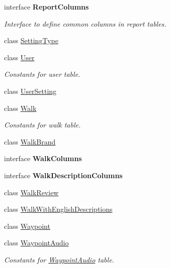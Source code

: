 \begin{DoxyCompactItemize}
interface {\bfseries Report\+Columns}
\begin{DoxyCompactList}\small\item\em Interface to define common columns in report tables. \end{DoxyCompactList}\item 
class \hyperlink{classuk_1_1ac_1_1swan_1_1digitaltrails_1_1database_1_1_white_rock_contract_1_1_setting_type}{Setting\+Type}
\item 
class \hyperlink{classuk_1_1ac_1_1swan_1_1digitaltrails_1_1database_1_1_white_rock_contract_1_1_user}{User}
\begin{DoxyCompactList}\small\item\em Constants for user table. \end{DoxyCompactList}\item 
class \hyperlink{classuk_1_1ac_1_1swan_1_1digitaltrails_1_1database_1_1_white_rock_contract_1_1_user_setting}{User\+Setting}
\item 
class \hyperlink{classuk_1_1ac_1_1swan_1_1digitaltrails_1_1database_1_1_white_rock_contract_1_1_walk}{Walk}
\begin{DoxyCompactList}\small\item\em Constants for walk table. \end{DoxyCompactList}\item 
class \hyperlink{classuk_1_1ac_1_1swan_1_1digitaltrails_1_1database_1_1_white_rock_contract_1_1_walk_brand}{Walk\+Brand}
\item 
interface {\bfseries Walk\+Columns}
\item 
interface {\bfseries Walk\+Description\+Columns}
\item 
class \hyperlink{classuk_1_1ac_1_1swan_1_1digitaltrails_1_1database_1_1_white_rock_contract_1_1_walk_review}{Walk\+Review}
\item 
class \hyperlink{classuk_1_1ac_1_1swan_1_1digitaltrails_1_1database_1_1_white_rock_contract_1_1_walk_with_english_descriptions}{Walk\+With\+English\+Descriptions}
\item 
class \hyperlink{classuk_1_1ac_1_1swan_1_1digitaltrails_1_1database_1_1_white_rock_contract_1_1_waypoint}{Waypoint}
\item 
class \hyperlink{classuk_1_1ac_1_1swan_1_1digitaltrails_1_1database_1_1_white_rock_contract_1_1_waypoint_audio}{Waypoint\+Audio}
\begin{DoxyCompactList}\small\item\em Constants for \hyperlink{classuk_1_1ac_1_1swan_1_1digitaltrails_1_1database_1_1_white_rock_contract_1_1_waypoint_audio}{Waypoint\+Audio} table. \end{DoxyCompactList}\item 

\end{DoxyCompactItemize}
